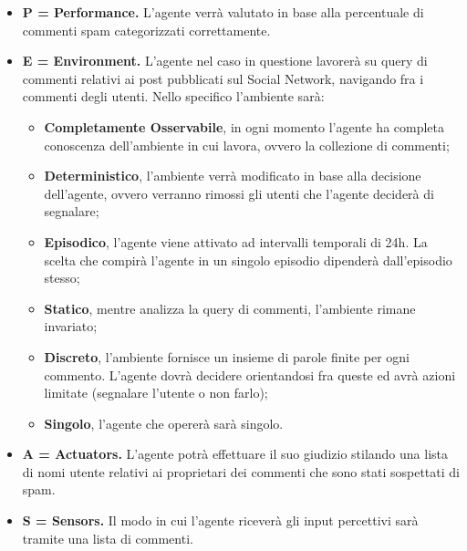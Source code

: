 \documentclass{report}
\begin{document}
    \begin{itemize}
        \item 
        {\bfseries P = Performance.} 
        L'agente verrà valutato in base alla percentuale di commenti spam categorizzati correttamente.
        \item 
        {\bfseries E = Environment.} L'agente nel caso in questione lavorerà su query di commenti relativi ai post pubblicati sul Social Network, 
        navigando fra i commenti degli utenti.\newline
        Nello specifico l'ambiente sarà:
            \begin{itemize}
                \item {\bfseries Completamente Osservabile}, in ogni momento l'agente ha completa conoscenza
                dell'ambiente in cui lavora, ovvero la collezione di commenti;
                \item {\bfseries Deterministico}, l'ambiente verrà modificato in base alla decisione dell'agente, 
                ovvero verranno rimossi gli utenti che l'agente deciderà di segnalare;
                \item {\bfseries Episodico}, l'agente viene attivato ad intervalli temporali di 24h. La scelta che compirà l'agente in un singolo episodio dipenderà dall'episodio stesso;
                \item {\bfseries Statico}, mentre analizza la query di commenti, l'ambiente rimane invariato;
                \item {\bfseries Discreto}, l'ambiente fornisce un insieme di parole finite per ogni commento. L'agente
                dovrà decidere orientandosi fra queste ed avrà azioni limitate (segnalare l'utente o non farlo); 
                \item {\bfseries Singolo}, l'agente che opererà sarà singolo.
            \end{itemize}
          
        \item 
        {\bfseries A = Actuators.} L'agente potrà effettuare il suo giudizio stilando una lista di nomi utente relativi ai proprietari dei commenti che sono stati sospettati di spam.
        \item 
        {\bfseries S = Sensors.} Il modo in cui l'agente riceverà gli input percettivi sarà tramite una lista di commenti.
        
    \end{itemize}
    
\end{document}

